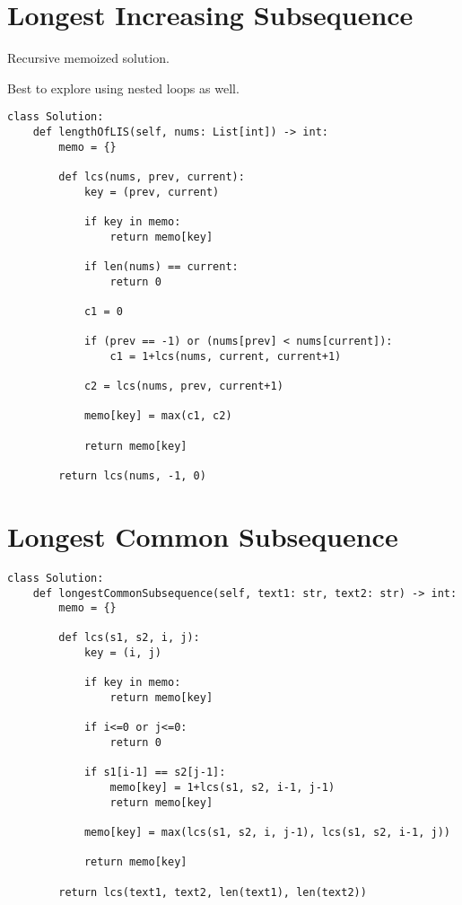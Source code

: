 \documentclass[24pt, a4]{article}
\begin{document}
\section{Longest Increasing Subsequence}
Recursive memoized solution.

Best to explore using nested loops as well.
\begin{lstlisting}
class Solution:
    def lengthOfLIS(self, nums: List[int]) -> int:
        memo = {}
        
        def lcs(nums, prev, current):
            key = (prev, current)
            
            if key in memo:
                return memo[key]
            
            if len(nums) == current:
                return 0
            
            c1 = 0
            
            if (prev == -1) or (nums[prev] < nums[current]):
                c1 = 1+lcs(nums, current, current+1)
            
            c2 = lcs(nums, prev, current+1)
            
            memo[key] = max(c1, c2)
            
            return memo[key]
        
        return lcs(nums, -1, 0)
\end{lstlisting}

\section{Longest Common Subsequence}
\begin{lstlisting}
class Solution:
    def longestCommonSubsequence(self, text1: str, text2: str) -> int:
        memo = {}
        
        def lcs(s1, s2, i, j):
            key = (i, j)
            
            if key in memo:
                return memo[key]
            
            if i<=0 or j<=0:
                return 0
            
            if s1[i-1] == s2[j-1]:
                memo[key] = 1+lcs(s1, s2, i-1, j-1)
                return memo[key]
            
            memo[key] = max(lcs(s1, s2, i, j-1), lcs(s1, s2, i-1, j))
            
            return memo[key]
        
        return lcs(text1, text2, len(text1), len(text2))
\end{lstlisting}
\end{document}
